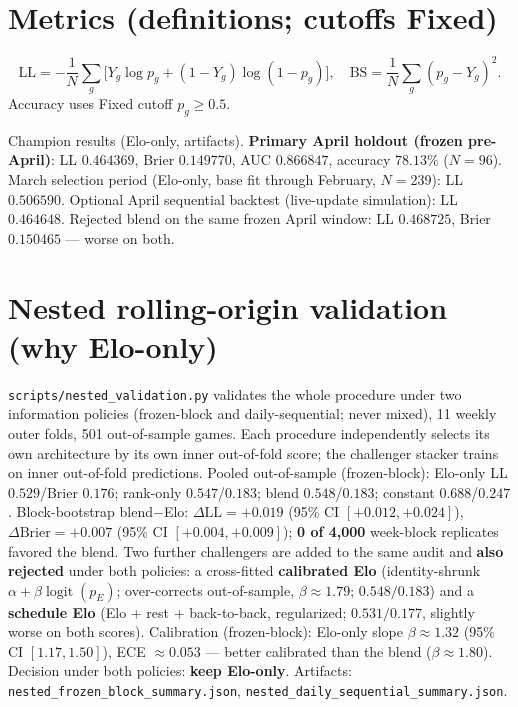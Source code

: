 \documentclass[10pt]{article}
\newcommand{\code}[1]{\texttt{#1}}
\begin{document}
\section{Metrics (definitions; cutoffs Fixed)}

\[
\mathrm{LL}
=
-\frac1N\sum_g
\big[Y_g\log p_g+(1-Y_g)\log(1-p_g)\big],
\quad
\mathrm{BS}
=
\frac1N\sum_g(p_g-Y_g)^2.
\]
Accuracy uses Fixed cutoff \(p_g\ge 0.5\).

Champion results (Elo-only, artifacts). \textbf{Primary April holdout (frozen
pre-April)}: LL \(0.464369\), Brier \(0.149770\), AUC \(0.866847\),
accuracy \(78.13\%\) (\(N=96\)). March selection period (Elo-only, base fit
through February, \(N=239\)): LL \(0.506590\). Optional April sequential
backtest (live-update simulation): LL \(0.464648\). Rejected blend on the same
frozen April window: LL \(0.468725\), Brier \(0.150465\) --- worse on both.

\section{Nested rolling-origin validation (why Elo-only)}
\label{sec:nested}

\code{scripts/nested\_validation.py} validates the whole procedure under two
information policies (frozen-block and daily-sequential; never mixed), 11 weekly
outer folds, 501 out-of-sample games. Each procedure independently selects its
own architecture by its own inner out-of-fold score; the challenger stacker
trains on inner out-of-fold predictions. Pooled out-of-sample (frozen-block):
Elo-only LL \(0.529\)/Brier \(0.176\); rank-only \(0.547\)/\(0.183\); blend
\(0.548\)/\(0.183\); constant \(0.688\)/\(0.247\). Block-bootstrap
blend\(-\)Elo: \(\Delta\mathrm{LL}=+0.019\) (95\% CI \([+0.012,+0.024]\)),
\(\Delta\mathrm{Brier}=+0.007\) (95\% CI \([+0.004,+0.009]\)); \textbf{0 of
4{,}000} week-block replicates favored the blend. Two further challengers are
added to the same audit and \textbf{also rejected} under both policies: a
cross-fitted \textbf{calibrated Elo} (identity-shrunk \(\alpha+\beta\operatorname{logit}(p_E)\);
over-corrects out-of-sample, \(\beta\approx1.79\); \(0.548/0.183\)) and a
\textbf{schedule Elo} (Elo + rest + back-to-back, regularized; \(0.531/0.177\),
slightly worse on both scores). Calibration (frozen-block): Elo-only slope
\(\beta\approx1.32\) (95\% CI \([1.17,1.50]\)), ECE \(\approx 0.053\) --- better
calibrated than the blend (\(\beta\approx1.80\)). Decision under both policies:
\textbf{keep Elo-only}. Artifacts:
\code{nested\_frozen\_block\_summary.json},
\code{nested\_daily\_sequential\_summary.json}.
\end{document}
